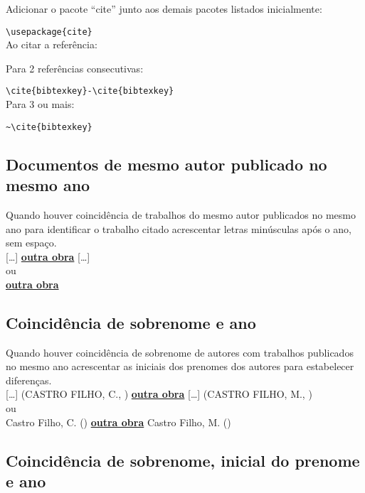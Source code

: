 Adicionar o pacote “cite” junto aos demais pacotes listados inicialmente:

\verb+\usepackage{cite}+ \\

Ao citar a referência:

Para 2 referências consecutivas: 

\verb+\cite{bibtexkey}-\cite{bibtexkey}+ \\

Para 3 ou mais: 

\verb+~\cite{bibtexkey}+ \\

\subsection{Documentos de mesmo autor publicado no mesmo ano}

Quando houver coincidência de trabalhos do mesmo autor publicados
no mesmo ano para identificar o trabalho citado acrescentar letras minúsculas após o ano, sem espaço.\\

[\ldots] \cite{Garcia2013b}   \textbf{\underline{outra obra}}   [\ldots] \cite{Garcia2013a} \\

ou\\

  \textbf{\underline{outra obra}}   

\subsection{Coincidência de sobrenome e ano}

Quando houver coincidência de sobrenome de autores com trabalhos
publicados no mesmo ano acrescentar as iniciais dos prenomes dos autores
para estabelecer diferenças.\\

[\ldots] (CASTRO FILHO, C., \citeyear{CastroC2012}) \textbf{\underline{outra obra}}   [\ldots] (CASTRO FILHO, M., \citeyear{CastroC2012}) \\

ou\\

Castro Filho, C. (\citeyear{CastroC2012}) \textbf{\underline{outra obra}}    Castro Filho, M. (\citeyear{CastroC2012})

\subsection{Coincidência de sobrenome, inicial do prenome e ano}

